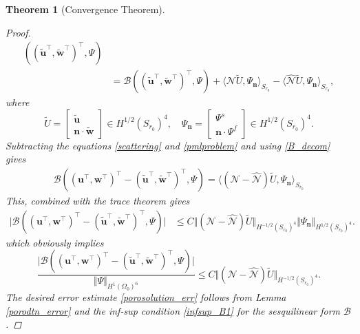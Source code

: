 \documentclass[11pt]{article}
\newcommand{\Om}{\Omega}
\newcommand{\wid}{\widetilde}
\newcommand{\bs}{\boldsymbol}
\newtheorem{theorem}{Theorem}[section]
\begin{document}
\begin{theorem}[Convergence Theorem]
\begin{proof}
\begin{equation}
\begin{aligned}
((\wid{\mathbf{u}}^{\top},\wid{\mathbf{w}}^{\top})^{\top},\Psi)\\&
=\mathcal{B}((\wid{\mathbf{u}}^{\top},\wid{\mathbf{w}}^{\top})^{\top},\Psi)
+\langle\mathcal{N}\wid{U},\Psi_{\bs{n}}\rangle_{S_{r_0}}-
\langle\hat{\mathcal{N}}\wid{U},\Psi_{\bs{n}}\rangle_{S_{r_0}},
\end{aligned} 
\end{equation}
where $$ \wid{U}=\begin{bmatrix}
\wid{\mathbf{u}} \\
\bs{n}\cdot \wid{\mathbf{w}} 	
\end{bmatrix}\in H^{1/2}(S_{r_0})^4,\quad \Psi_{\bs{n}}=\begin{bmatrix}
\Psi^s \\
\bs{n}\cdot \Psi^f 
\end{bmatrix}\in H^{1/2}(S_{r_0})^4. $$
Subtracting the equations \eqref{scattering} and \eqref{pmlproblem} and using \eqref{B_decom} gives
\begin{equation}
\begin{aligned}
\mathcal{B}((\mathbf{u}^{\top},\mathbf{w}^{\top})^{\top}-(\wid{\mathbf{u}}^{\top},
\wid{\mathbf{w}}^{\top})^{\top},\Psi)=\langle (\mathcal{N}-\hat{\mathcal{N}})\wid{U},
\Psi_{\bs{n}}\rangle_{S_{r_0}}
\end{aligned} 
\end{equation}
This, combined with the trace theorem gives
\begin{equation}
\begin{aligned}
\lvert \mathcal{B}((\mathbf{u}^{\top},\mathbf{w}^{\top})^{\top}-(\wid{\mathbf{u}}^{\top},
\wid{\mathbf{w}}^{\top})^{\top},\Psi)\rvert&\leq C\Vert (\mathcal{N}-\hat{\mathcal{N}})
\wid{U}\Vert_{ H^{-1/2}(S_{r_0})^4}\Vert\Psi _{\bs{n}}\Vert_{H^{1/2}(S_{r_0})^4}.
\end{aligned} 
\end{equation}
which obviously implies
\begin{equation}\label{eq:label}
\frac{\lvert \mathcal{B}((\mathbf{u}^{\top},\mathbf{w}^{\top})^{\top}-
(\wid{\mathbf{u}}^{\top},\wid{\mathbf{w}}^{\top})^{\top},\Psi)\rvert}{\Vert\Psi \Vert_{H^{1}(\Om_0)^6}}
\leq C\Vert (\mathcal{N}-\hat{\mathcal{N}})\wid{U}\Vert_{ H^{-1/2}(S_{r_0})^4}.
\end{equation}
The desired error estimate \eqref{porosolution_err} follows from Lemma \ref{porodtn_error}
and the inf-sup condition \eqref{infsup_B1} for the sesquilinear form $ \mathcal{B}$.
\end{proof} 
\end{theorem}
\end{document}
